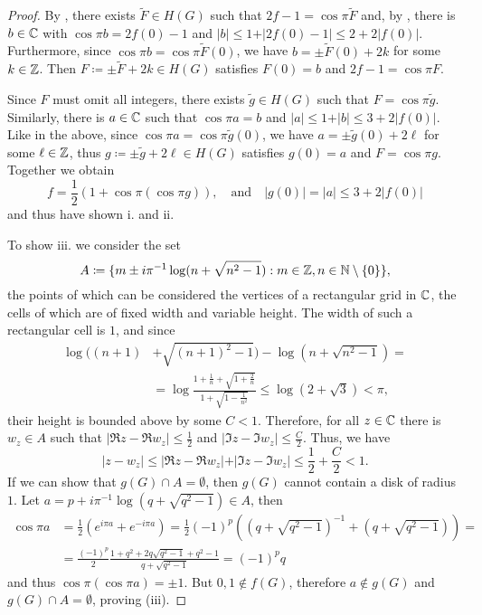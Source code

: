 \begin{proof}
    By , there exists $\widetilde{F} \in H(G)$ such that $2f - 1 = \cos \pi \widetilde{F}$ and, by , there is $b \in \mathbb{C}$ with $\cos \pi b = 2f(0) - 1$ and $\vert b \vert \leq 1 + \vert 2 f(0) - 1 \vert \leq 2 + 2 \vert f(0) \vert$. Furthermore, since $\cos \pi b = \cos \pi \widetilde{F}(0)$, we have $b = \pm \widetilde{F}(0) + 2k$ for some $k \in \mathbb{Z}$. Then $F \coloneqq \pm \widetilde{F} + 2k \in H(G)$ satisfies $F(0) = b$ and $2f - 1 = \cos \pi F$.
    
    Since $F$ must omit all integers, there exists $\widetilde{g} \in H(G)$ such that $F = \cos \pi \widetilde{g}$. Similarly, there is $a \in \mathbb{C}$ such that $\cos \pi a = b$ and $\vert a \vert \leq 1 + \vert b \vert \leq 3 + 2 \vert f(0) \vert$. Like in the above, since $\cos \pi a = \cos \pi \widetilde{g}(0)$, we have $a = \pm \widetilde{g}(0) + 2\ell$ for some $\ell \in \mathbb{Z}$, thus $g \coloneqq \pm \widetilde{g} + 2\ell \in H(G)$ satisfies $g(0) = a$ and $F = \cos \pi g$. Together we obtain
    $$ \textstyle f = \frac{1}{2} (1 + \cos \pi (\cos \pi g)), \quad \textrm{and} \quad \vert g(0) \vert = \vert a \vert \leq 3 + 2 \vert f(0) \vert $$
    and thus have shown i. and ii.

    To show iii. we consider the set
    $$ A \coloneqq \{ m \pm i \pi^{-1} \log (n + \sqrt{n^2 - 1}) : m \in \mathbb{Z}, n \in \mathbb{N} \setminus \{ 0 \} \}, $$
    the points of which can be considered the vertices of a rectangular grid in $\mathbb{C}$, the cells of which are of fixed width and variable height. The width of such a rectangular cell is $1$, and since
    \begin{align*}
        \log ((n+1) &+ \sqrt{(n+1)^2 - 1}) - \log (n + \sqrt{n^2 - 1}) = \\
        &= \log \frac{1 + \frac{1}{n} + \sqrt{1 + \frac{2}{n}}}{1 + \sqrt{1 - \frac{1}{n^2}}} \leq \log (2 + \sqrt{3}) < \pi,
    \end{align*}
    their height is bounded above by some $C < 1$. Therefore, for all $z \in \mathbb{C}$ there is $w_z \in A$ such that $\vert \Re z - \Re w_z \vert \leq \frac{1}{2}$ and $\vert \Im z - \Im w_z \vert \leq \frac{C}{2}$. Thus, we have
    $$ \vert z - w_z \vert \leq \vert \Re z - \Re w_z \vert + \vert \Im z - \Im w_z \vert \leq \frac{1}{2} + \frac{C}{2} < 1. $$
    If we can show that $g(G) \cap A = \emptyset$, then $g(G)$ cannot contain a disk of radius $1$. Let $a = p + i \pi^{-1} \log(q + \sqrt{q^2 - 1}) \in A$, then
    \begin{align*}
        \cos \pi a &= {\textstyle\frac{1}{2}}( e^{i \pi a} + e^{-i \pi a}) = {\textstyle\frac{1}{2}} (-1)^p ((q + \sqrt{q^2 - 1})^{-1} + (q + \sqrt{q^2 - 1})) = \\
        &= \frac{(-1)^p}{2} \frac{1 + q^2 + 2q \sqrt{q^2 - 1} + q^2 - 1}{q + \sqrt{q^2 - 1}} = (-1)^p q
    \end{align*}
    and thus $\cos \pi (\cos \pi a) = \pm 1$. But $0, 1 \notin f(G)$, therefore $a \notin g(G)$ and $g(G) \cap A = \emptyset$, proving (iii).


\end{proof}
